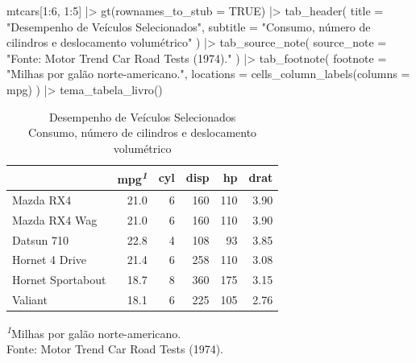\documentclass[
  brazilian,
  11pt,
  a4paper,
  open = right,
  twoside = true]{scrbook}
\newenvironment{Shaded}{\begin{snugshade}}{\end{snugshade}}
\newcommand{\AttributeTok}[1]{\textcolor[rgb]{0.00,0.28,0.67}{#1}}
\newcommand{\ConstantTok}[1]{\textcolor[rgb]{0.00,0.77,0.85}{#1}}
\newcommand{\DecValTok}[1]{\textcolor[rgb]{0.55,0.29,0.58}{#1}}
\newcommand{\FunctionTok}[1]{\textcolor[rgb]{1.00,0.23,0.00}{#1}}
\newcommand{\NormalTok}[1]{\textcolor[rgb]{0.10,0.10,0.10}{#1}}
\newcommand{\SpecialCharTok}[1]{\textcolor[rgb]{0.85,0.00,0.31}{#1}}
\newcommand{\StringTok}[1]{\textcolor[rgb]{0.00,0.72,0.25}{#1}}
\begin{document}
\begin{Shaded}
\begin{Highlighting}[numbers=left,,]
\NormalTok{mtcars[}\DecValTok{1}\SpecialCharTok{:}\DecValTok{6}\NormalTok{, }\DecValTok{1}\SpecialCharTok{:}\DecValTok{5}\NormalTok{] }\SpecialCharTok{|\textgreater{}}
  \FunctionTok{gt}\NormalTok{(}\AttributeTok{rownames\_to\_stub =} \ConstantTok{TRUE}\NormalTok{) }\SpecialCharTok{|\textgreater{}}
  \FunctionTok{tab\_header}\NormalTok{(}
    \AttributeTok{title =} \StringTok{"Desempenho de Veículos Selecionados"}\NormalTok{,}
    \AttributeTok{subtitle =} \StringTok{"Consumo, número de cilindros e deslocamento volumétrico"}
\NormalTok{  ) }\SpecialCharTok{|\textgreater{}}
  \FunctionTok{tab\_source\_note}\NormalTok{(}
    \AttributeTok{source\_note =} \StringTok{"Fonte: Motor Trend Car Road Tests (1974)."}
\NormalTok{  ) }\SpecialCharTok{|\textgreater{}}
  \FunctionTok{tab\_footnote}\NormalTok{(}
    \AttributeTok{footnote =} \StringTok{"Milhas por galão norte{-}americano."}\NormalTok{,}
    \AttributeTok{locations =} \FunctionTok{cells\_column\_labels}\NormalTok{(}\AttributeTok{columns =}\NormalTok{ mpg)}
\NormalTok{  ) }\SpecialCharTok{|\textgreater{}}
  \FunctionTok{tema\_tabela\_livro}\NormalTok{()}
\end{Highlighting}
\end{Shaded}

\begin{table}
\caption*{
{\fontsize{20}{25}\selectfont  Desempenho de Veículos Selecionados\fontsize{12}{15}\selectfont } \\ 
{\fontsize{14}{17}\selectfont  Consumo, número de cilindros e deslocamento volumétrico\fontsize{12}{15}\selectfont }
} 
\fontsize{12.0pt}{14.0pt}\selectfont
\begin{tabular*}{\linewidth}{@{\extracolsep{\fill}}l|rrrrr}
\toprule
 & mpg\textsuperscript{\textit{1}} & cyl & disp & hp & drat \\ 
\midrule\addlinespace[2.5pt]
Mazda RX4 & 21.0 & 6 & 160 & 110 & 3.90 \\ 
Mazda RX4 Wag & 21.0 & 6 & 160 & 110 & 3.90 \\ 
Datsun 710 & 22.8 & 4 & 108 & 93 & 3.85 \\ 
Hornet 4 Drive & 21.4 & 6 & 258 & 110 & 3.08 \\ 
Hornet Sportabout & 18.7 & 8 & 360 & 175 & 3.15 \\ 
Valiant & 18.1 & 6 & 225 & 105 & 2.76 \\ 
\bottomrule
\end{tabular*}
\begin{minipage}{\linewidth}
\vspace{.05em}
{\fontsize{9}{11}\selectfont \textcolor[HTML]{0047AB}{\textsuperscript{\textit{1}}Milhas por galão norte-americano.}}\\
{\fontsize{9}{11}\selectfont \textcolor[HTML]{0047AB}{Fonte: Motor Trend Car Road Tests (1974).\\
}}\end{minipage}
\end{table}
\end{document}
